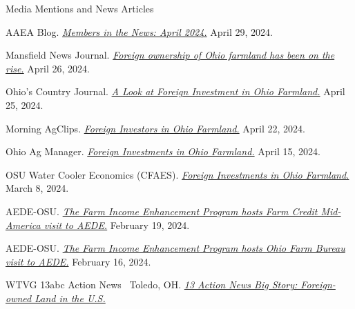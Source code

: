 \documentclass{resume} %
\begin{document}
\begin{rSection}{Media Mentions and News Articles}
\vspace{-1em}
    \item AAEA Blog. \href{http://blog.aaea.org/2024/04/members-in-news-april-29-2024.html}{\textit{Members in the News: April 2024.}} April 29, 2024.


    \item Mansfield News Journal. \href{https://www.mansfieldnewsjournal.com/story/news/2024/04/26/ohio-farmland-foreign-ownership-increase-agricultural-environmental-development-economics-report/73428302007/}{\textit{Foreign ownership of Ohio farmland has been on the rise.}} April 26, 2024.
 \item Ohio’s Country Journal. \href{https://ocj.com/2024/04/a-look-at-foreign-investment-in-ohio-farmland/}{\textit{A Look at Foreign Investment in Ohio Farmland.}} April 25, 2024.

 \item Morning AgClips. \href{https://www.morningagclips.com/foreign-investors-in-ohio-farmland/}{\textit{Foreign Investors in Ohio Farmland.}} April 22, 2024.
    
    \item Ohio Ag Manager. \href{https://u.osu.edu/ohioagmanager/2024/04/15/foreign-investments-in-ohio-farmland/}{\textit{Foreign Investments in Ohio Farmland.}} April 15, 2024.

    \item OSU Water Cooler Economics (CFAES). \href{https://u.osu.edu/aede/2024/03/08/foreign-investments-in-ohio-farmland/}{\textit{Foreign Investments in Ohio Farmland.}} March 8, 2024.

     

 \item AEDE-OSU. \textit{\href{https://aede.osu.edu/news/farm-income-enhancement-program-hosts-farm-credit-mid-america-visit-aede}{The Farm Income Enhancement Program hosts Farm Credit Mid-America visit to AEDE.}} February 19, 2024.
      
    \item AEDE-OSU. \textit{\href{https://aede.osu.edu/news/farm-income-enhancement-program-hosts-ohio-farm-bureau-visit-aede}{The Farm Income Enhancement Program hosts Ohio Farm Bureau visit to AEDE.}} February 16, 2024.

    \item WTVG 13abc Action News \textbar\ Toledo, OH. 
\textit{\href{https://www.youtube.com/watch?v=TdF_eXvzcs0}{13 Action News Big Story: Foreign-owned Land in the U.S.}}
\end{rSection}
\end{document}
